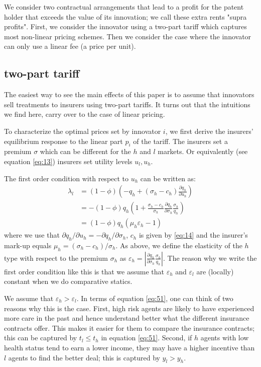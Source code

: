 \documentclass[12pt,english,a4paper]{article}
\begin{document}
We consider two contractual arrangements that lead to a profit for the patent holder that exceeds the value of its innovation; we call these extra rents "supra profits". First, we consider the innovator using a two-part tariff which captures most non-linear pricing schemes. Then we consider the case where the innovator can only use a linear fee (a price per unit).

\subsection{two-part tariff}
\label{sec:orgd9e39f0}

The easiest way to see the main effects of this paper is to assume that innovators sell treatments to insurers using two-part tariffs. It turns out that the intuitions we find here, carry over to the case of linear pricing.

To characterize the optimal prices set by innovator \(i\), we first derive the insurers' equilibrium response to the linear part \(p_i\) of the tariff. The insurers set a premium \(\sigma\) which can be different for the \(h\) and \(l\) markets. Or equivalently (see equation \eqref{eq:13}) insurers set utility levels \(u_l,u_h\).

The first order condition with respect to \(u_h\) can be written as:
\begin{align}
\nonumber
\lambda_l &= (1-\phi) \left(-q_h + (\sigma_h-c_h) \frac{\partial q_h}{\partial u_h}   \right)\\
\nonumber &=- (1-\phi) q_h \left(1 + \frac{\sigma_h-c_h}{\sigma_h} \frac{\partial q_h}{\partial \sigma_h} \frac{\sigma_h}{q_{h}}   \right)\\
\label{eq:26}
          & = (1-\phi) q_h (\mu_h \varepsilon_h-1)
\end{align}
where we use that \(\partial q_h/\partial u_h = - \partial q_h/\partial \sigma_h\), \(c_h\) is given by \eqref{eq:14} and the insurer's mark-up equals \(\mu_h = (\sigma_{h}-c_h)/\sigma_h\). As above, we define the elasticity of the \(h\) type with respect to the premium \(\sigma_h\) as \(\varepsilon_h = |\frac{\partial q_h}{\partial \sigma_h} \frac{\sigma_h}{q_{h}}|\). The reason why we write the first order condition like this is that we assume that \(\varepsilon_h\) and \(\varepsilon_l\) are (locally) constant when we do comparative statics.

We assume that \(\varepsilon_{h} > \varepsilon_{l}\). In terms of equation \eqref{eq:51}, one can think of two reasons why this is the case. First, high risk agents are likely to have experienced more care in the past and hence understand better what the different insurance contracts offer. This makes it easier for them to compare the insurance contracts; this can be captured by \(t_l \le t_h\) in equation \eqref{eq:51}. Second, if \(h\) agents with low health status tend to earn a lower income, they may have a higher incentive than \(l\) agents to find the better deal; this is captured by \(y_l>y_h\).
\end{document}

